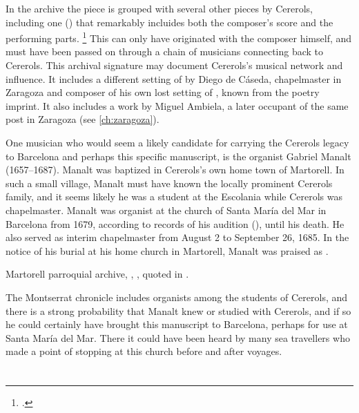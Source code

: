 In the archive the piece is grouped with several other pieces by Cererols,
including one () that remarkably incluides
both the composer's score and the performing parts.%
    \footnote{.}
This can only have originated with the composer himself, and must have been
passed on through a chain of musicians connecting back to Cererols.
This archival signature may document Cererols's musical network and influence.
It includes a different setting of  by Diego
de Cáseda, chapelmaster in Zaragoza and composer of his own lost setting of
, known from the poetry imprint.
It also includes a work by Miguel Ambiela, a later occupant of the same post in
Zaragoza (see \cref{ch:zaragoza}).

One musician who would seem a likely candidate for carrying the Cererols legacy
to Barcelona and perhaps this specific manuscript, is the organist Gabriel
Manalt (1657--1687).
Manalt was baptized in Cererols's own home town of Martorell.
In such a small village, Manalt must have known the locally prominent Cererols
family, and it seems likely he was a student at the Escolania while Cererols was
chapelmaster.
Manalt was organist at the church of Santa María del Mar in Barcelona from 1679,
according to records of his audition (), until his death.
He also served as interim chapelmaster from August 2 to September 26, 1685.%
    \Autocite[70--71]{Balanza:CererolsFamily}
In the notice of his burial at his home church in Martorell, Manalt was praised
as .%
\begin{Footnote}
    Martorell parroquial archive, ,
    , quoted in 
    \autocite
    [{\XXX[original]}]
    [70]
    {Balanza:CererolsFamily}.
\end{Footnote}
The Montserrat chronicle includes organists among the students of Cererols, and
there is a strong probability that Manalt knew or studied with Cererols, and if
so he could certainly have brought this manuscript to Barcelona, perhaps for use
at Santa María del Mar.
There it could have been heard by many sea travellers who made a point of
stopping at this church before and after voyages.\XXX[really?]








\section{}



\endinput
